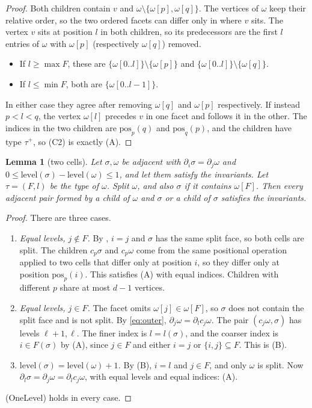 \documentclass[11pt]{article}
\theoremstyle{plain}
\newtheorem{lemma}[theorem]{Lemma}
\theoremstyle{definition}
\theoremstyle{remark}
\newcommand{\level}{\mathrm{level}}
\newcommand{\pos}{\mathrm{pos}}
\begin{document}
\begin{proof}
Both children contain $v$ and $\omega\setminus\{\omega[p],\omega[q]\}$. The
vertices of $\omega$ keep their relative order, so the two ordered
facets can differ only in where $v$ sits. The vertex $v$ sits at position
$l$ in both children, so its predecessors are the first $l$ entries of
$\omega$ with $\omega[p]$ (respectively $\omega[q]$) removed.
\begin{itemize}
\item If $l\ge\max F$, these are $\{\omega[0..l]\}\setminus\{\omega[p]\}$ and
  $\{\omega[0..l]\}\setminus\{\omega[q]\}$.
\item If $l\le\min F$, both are $\{\omega[0..l-1]\}$.
\end{itemize}
In either case they agree after removing $\omega[q]$ and $\omega[p]$
respectively. If instead $p<l<q$, the vertex $\omega[l]$ precedes $v$ in
one facet and follows it in the other. The indices in the two children
are $\pos_p(q)$ and $\pos_q(p)$, and the children have type $\tau^+$, so (C2)
is exactly (A).
\end{proof}

\begin{lemma}[two cells]\label{lem:two}
Let $\sigma,\omega$ be adjacent with $\partial_i\sigma=\partial_j\omega$ and
$0\le\level(\sigma)-\level(\omega)\le1$, and let them satisfy the
invariants. Let $\tau=(F,l)$ be the type of $\omega$. Split $\omega$, and also
$\sigma$ if it contains $\omega[F]$. Then every adjacent pair formed by a
child of $\omega$ and $\sigma$ or a child of $\sigma$ satisfies the
invariants.
\end{lemma}

\begin{proof}
There are three cases.
\begin{enumerate}[label=(\alph*)]
\item \emph{Equal levels, $j\notin F$.} By , $i=j$ and
  $\sigma$ has the same split face, so both cells are split. The children
  $c_p\sigma$ and $c_p\omega$ come from the same positional operation
  applied to two cells that differ only at position $i$, so they differ
  only at position $\pos_p(i)$. This satisfies (A) with equal indices.
  Children with different $p$ share at most $d-1$ vertices.
\item \emph{Equal levels, $j\in F$.} The facet omits $\omega[j]\in\omega[F]$,
  so $\sigma$ does not contain the split face and is not split. By
  \eqref{eq:outer}, $\partial_j\omega=\partial_l c_j\omega$. The pair
  $(c_j\omega,\sigma)$ has levels $\ell+1,\ell$. The finer index is
  $l=l(\sigma)$, and the coarser index is $i\in F(\sigma)$ by (A), since
  $j\in F$ and either $i=j$ or $\{i,j\}\subseteq F$. This is (B).
\item \emph{$\level(\sigma)=\level(\omega)+1$.} By (B), $i=l$ and $j\in F$, and
  only $\omega$ is split. Now $\partial_l\sigma=\partial_j\omega=\partial_l c_j\omega$,
  with equal levels and equal indices: (A).
\end{enumerate}
(OneLevel) holds in every case.
\end{proof}
\end{document}
